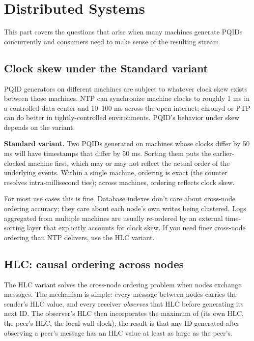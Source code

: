 \section{Distributed Systems}
\label{sec:distributed}

This part covers the questions that arise when many machines generate PQIDs concurrently and consumers need to make sense of the resulting stream.

\subsection{Clock skew under the Standard variant}

PQID generators on different machines are subject to whatever clock skew exists between those machines. NTP \citep{rfc5905} can synchronize machine clocks to roughly 1 ms in a controlled data center and 10--100 ms across the open internet; chronyd or PTP \citep{ieee1588} can do better in tightly-controlled environments. PQID's behavior under skew depends on the variant.

\textbf{Standard variant.} Two PQIDs generated on machines whose clocks differ by 50 ms will have timestamps that differ by 50 ms. Sorting them puts the earlier-clocked machine first, which may or may not reflect the actual order of the underlying events. Within a single machine, ordering is exact (the counter resolves intra-millisecond ties); across machines, ordering reflects clock skew.

For most use cases this is fine. Database indexes don't care about cross-node ordering accuracy; they care about each node's own writes being clustered. Logs aggregated from multiple machines are usually re-ordered by an external time-sorting layer that explicitly accounts for clock skew. If you need finer cross-node ordering than NTP delivers, use the HLC variant.

\subsection{HLC: causal ordering across nodes}

The HLC variant solves the cross-node ordering problem when nodes exchange messages. The mechanism is simple: every message between nodes carries the sender's HLC value, and every receiver \emph{observes} that HLC before generating its next ID. The observer's HLC then incorporates the maximum of (its own HLC, the peer's HLC, the local wall clock); the result is that any ID generated after observing a peer's message has an HLC value at least as large as the peer's.

